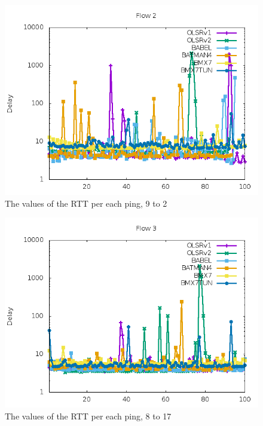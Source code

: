 \documentclass[10pt,onecolumn]{paper}
\begin{document}
\begin{figure}[!htb]
  \centering
  \includegraphics[width=.9\linewidth]{images/failure_test_delay_distribution-IPv6-2-timesequence.png}
    \caption{The values of the RTT per each ping, 9 to 2}
  \label{fig:delaysequence2}
\end{figure}

\begin{figure}[!htb]
  \centering
  \includegraphics[width=.9\linewidth]{images/failure_test_delay_distribution-IPv6-3-timesequence.png}
    \caption{The values of the RTT per each ping, 8 to 17}
  \label{fig:delaysequence3}
\end{figure}
\end{document}
